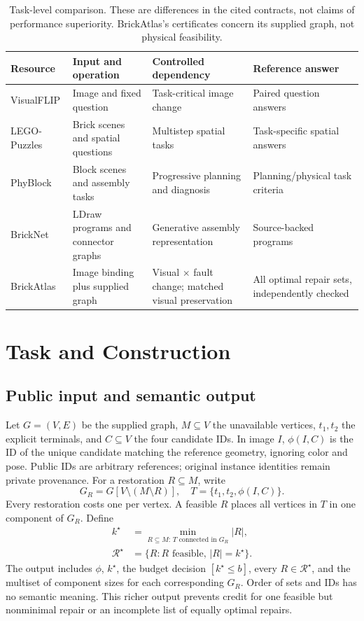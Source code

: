 \documentclass[10pt,twocolumn,letterpaper]{article}
\begin{document}
\begin{table}[t]
\centering\small
\caption{Task-level comparison. These are differences in the cited
contracts, not claims of performance superiority. BrickAtlas's
certificates concern its supplied graph, not physical feasibility.}
\label{tab:related}
\begin{tabularx}{\textwidth}{@{}lXXX@{}}
\toprule
Resource & Input and operation & Controlled dependency & Reference answer\\
\midrule
VisualFLIP & Image and fixed question & Task-critical image change & Paired question answers\\
LEGO-Puzzles & Brick scenes and spatial questions & Multistep spatial tasks & Task-specific spatial answers\\
PhyBlock & Block scenes and assembly tasks & Progressive planning and diagnosis & Planning/physical task criteria\\
BrickNet & LDraw programs and connector graphs & Generative assembly representation & Source-backed programs\\
BrickAtlas & Image binding plus supplied graph & Visual $\times$ fault change; matched visual preservation & All optimal repair sets, independently checked\\
\bottomrule
\end{tabularx}
\end{table}

\section{Task and Construction}
\subsection{Public input and semantic output}
Let $G=(V,E)$ be the supplied graph, $M\subseteq V$ the unavailable
vertices, $t_1,t_2$ the explicit terminals, and $C\subseteq V$
the four candidate IDs. In image $I$, $\phi(I,C)$ is the ID of
the unique candidate matching the reference geometry, ignoring
color and pose. Public IDs are arbitrary references; original
instance identities remain private provenance.
For a restoration $R\subseteq M$, write
\[
G_R=G[V\setminus(M\setminus R)],\quad
T=\{t_1,t_2,\phi(I,C)\}.
\]
Every restoration costs one per vertex. A feasible $R$ places
all vertices in $T$ in one component of $G_R$.
Define
\begin{align*}
k^\star&=\min_{R\subseteq M:\,T\text{ connected in }G_R}|R|,\\
\mathcal{R}^\star&=\{R: R\text{ feasible},\,|R|=k^\star\}.
\end{align*}
The output includes $\phi$, $k^\star$, the budget decision
$[k^\star\leq b]$, every $R\in\mathcal R^\star$, and the multiset
of component sizes for each corresponding $G_R$.
Order of sets and IDs has no semantic meaning.
This richer output prevents credit for one feasible but nonminimal
repair or an incomplete list of equally optimal repairs.
\end{document}

